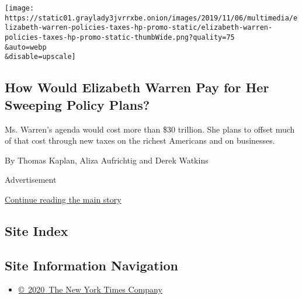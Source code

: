 \begin{enumerate}
  \texttt{[image: https://static01.graylady3jvrrxbe.onion/images/2019/11/06/multimedia/elizabeth-warren-policies-taxes-hp-promo-static/elizabeth-warren-policies-taxes-hp-promo-static-thumbWide.png?quality=75\\\&auto=webp\\\&disable=upscale]}

  \hypertarget{how-would-elizabeth-warren-pay-for-her-sweeping-policy-plans}{%
  \subsection{How Would Elizabeth Warren Pay for Her Sweeping Policy
  Plans?}\label{how-would-elizabeth-warren-pay-for-her-sweeping-policy-plans}}

  Ms. Warren's agenda would cost more than \$30 trillion. She plans to
  offset much of that cost through new taxes on the richest Americans
  and on businesses.

  By Thomas Kaplan, Aliza Aufrichtig and Derek Watkins
\end{enumerate}

Advertisement

\protect\hyperlink{after-mid2}{Continue reading the main story}

\hypertarget{site-index}{%
\subsection{Site Index}\label{site-index}}

\hypertarget{site-information-navigation}{%
\subsection{Site Information
Navigation}\label{site-information-navigation}}

\begin{itemize}
\tightlist
\item
  \href{https://help.nytimes3xbfgragh.onion/hc/en-us/articles/115014792127-Copyright-notice}{©~2020~The
  New York Times Company}
\end{itemize}

